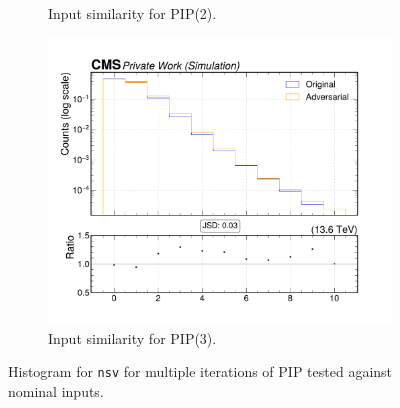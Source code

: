 \begin{figure}[htbp]
\begin{subfigure}[t]{0.32\textwidth}
    \caption{Input similarity for PIP(2).}
  \end{subfigure}\hfill
  \begin{subfigure}[t]{0.32\textwidth}
    \includegraphics[width=\linewidth]{media/output/features/compare/intprob_3/cmp_global_features_nsv.pdf}
    \caption{Input similarity for PIP(3).}
  \end{subfigure}

  \caption{Histogram for \texttt{nsv} for multiple iterations of PIP tested against nominal inputs.}
  \label{fig:intprob_input_nsv}
\end{figure}
